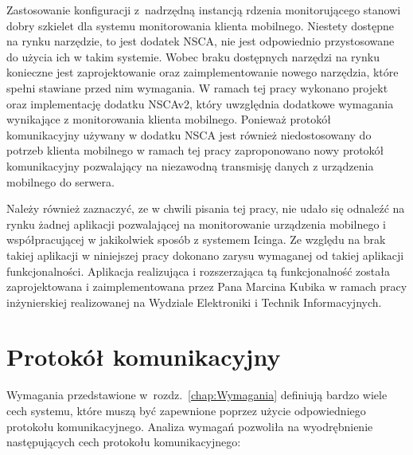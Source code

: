 Zastosowanie konfiguracji z~nadrzędną instancją rdzenia monitorującego
stanowi dobry szkielet dla systemu monitorowania klienta
mobilnego. Niestety dostępne na rynku narzędzie, to jest dodatek NSCA,
nie jest odpowiednio przystosowane do użycia ich w takim
systemie. Wobec braku dostępnych narzędzi na rynku konieczne jest
zaprojektowanie oraz zaimplementowanie nowego narzędzia, które spełni
stawiane przed nim wymagania. W ramach tej pracy wykonano projekt oraz
implementację dodatku NSCAv2, który uwzględnia dodatkowe wymagania
wynikające z monitorowania klienta mobilnego. Ponieważ protokół
komunikacyjny używany w dodatku NSCA jest również niedostosowany do
potrzeb klienta mobilnego w ramach tej pracy zaproponowano nowy
protokół komunikacyjny pozwalający na niezawodną transmisję danych z
urządzenia mobilnego do serwera.

Należy również zaznaczyć, ze w chwili pisania tej pracy, nie udało się
odnaleźć na rynku żadnej aplikacji pozwalającej na monitorowanie
urządzenia mobilnego i współpracującej w jakikolwiek sposób z systemem
Icinga. Ze względu na brak takiej aplikacji w niniejszej pracy
dokonano zarysu wymaganej od takiej aplikacji
funkcjonalności. Aplikacja realizująca i rozszerzająca tą
funkcjonalność została zaprojektowana i zaimplementowana przez Pana
Marcina Kubika w ramach pracy inżynierskiej\cite{book:pracaKubika}
realizowanej na Wydziale Elektroniki i Technik Informacyjnych.


\section[Protokół komunikacyjny][Protokół komunikacyjny]{Protokół komunikacyjny}
\label{sec:ProtKom}

Wymagania przedstawione w~rozdz.~\ref{chap:Wymagania} definiują bardzo wiele
cech systemu, które muszą być zapewnione poprzez użycie odpowiedniego
protokołu komunikacyjnego. Analiza wymagań pozwoliła na wyodrębnienie
następujących cech protokołu komunikacyjnego:

